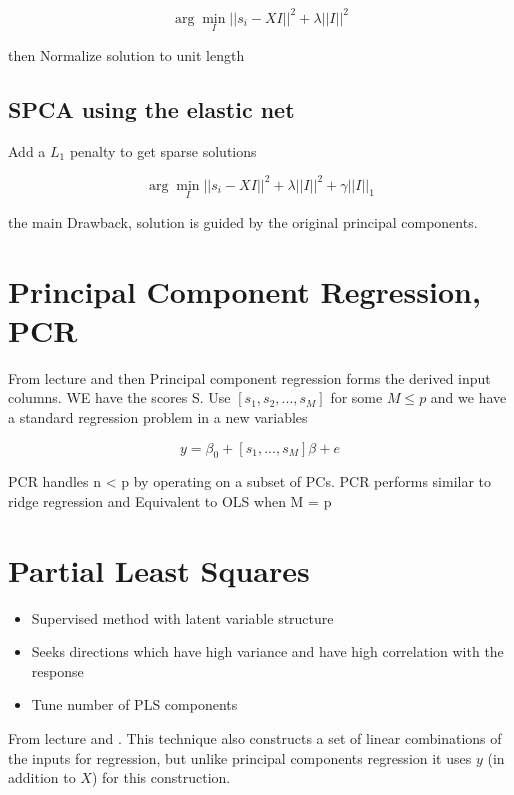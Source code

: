 \[
    \arg \min\limits_I || s_i - XI ||^2 + \lambda || I ||^2
\]

then Normalize solution to unit length

\subsection{SPCA using the elastic net}

Add a $L_1$ penalty to get sparse solutions

\[
    \arg \min\limits_I || s_i - XI ||^2 + \lambda || I ||^2 + \gamma ||I||_1
\]

the main Drawback, solution is guided by the original principal components. \cite[p.~52]{lecture6}

\section{Principal Component Regression, PCR}

From lecture \cite[p.~54]{lecture6} and \cite[p.~79]{friedman2016elements} then Principal component regression forms the derived input columns. WE have the scores S. Use $[s_1, s_2, ..., s_M]$ for some $M \leq p$ and we have a standard regression problem in a new variables

\[
    y = \beta_0 + [s_1,..., s_M] \beta + e
\]

PCR handles n < p by operating on a subset of PCs. PCR performs similar to ridge regression and Equivalent to OLS when M = p

\section{Partial Least Squares}

\begin{itemize}
  \item Supervised method with latent variable structure
  \item Seeks directions which have high variance and have high correlation with the response
  \item Tune number of PLS components
\end{itemize}

From lecture \cite[p.~55]{lecture6} and \cite[p.~80]{friedman2016elements}. This technique also constructs a set of linear combinations of the inputs
for regression, but unlike principal components regression it uses $y$ (in addition to $X$) for this construction.\\

